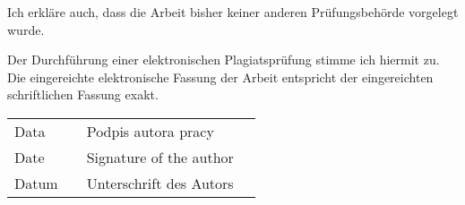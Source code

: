 \begin{singlespace}
\begin{de}
		Ich erkläre auch, dass die Arbeit bisher keiner anderen Prüfungsbehörde vorgelegt wurde.
		
		Der Durchführung einer elektronischen Plagiatsprüfung stimme ich hiermit zu. Die eingereichte elektronische Fassung der Arbeit entspricht der eingereichten schriftlichen Fassung exakt.
	\end{de}

	\vspace{2cm}

	\begin{tabular}{llll}
		Data & \makebox[3.9cm]{\dotfill} & Podpis autora pracy & \makebox[3.9cm]{\dotfill}\\
		Date & & Signature of the author & \\
		Datum & & Unterschrift des Autors & \\
	\end{tabular}
\end{singlespace}
